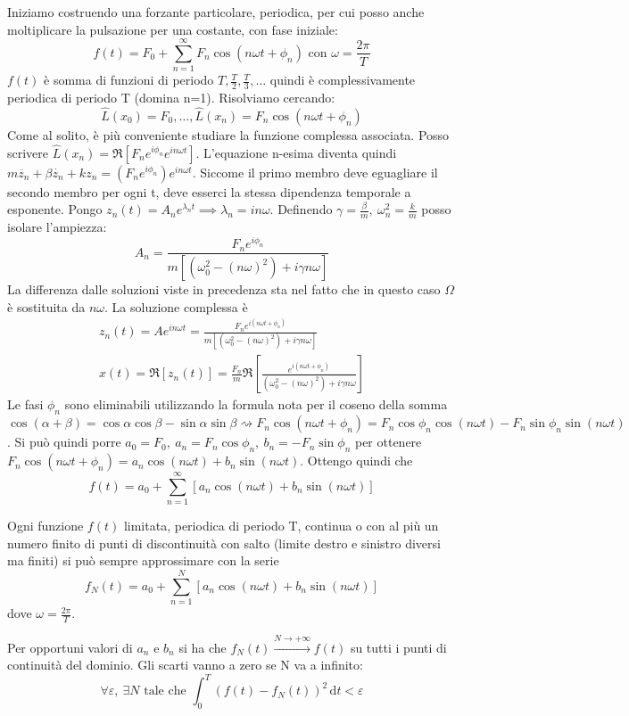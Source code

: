 Iniziamo costruendo una forzante particolare, periodica, per cui posso anche moltiplicare la pulsazione per una costante, con fase iniziale:
\[
	f(t) = F_0 + \sum_{n=1}^{\infty} F_n \cos (n \omega t + \phi _n) \text{ con } \omega = \frac{2\pi }{T} 
\]
\(f(t)\) è somma di funzioni di periodo \(T, \frac{T}{2}, \frac{T}{3}, \dots \) quindi è complessivamente periodica di periodo T (domina n=1). Risolviamo cercando:
\[
	\hat{L} (x_0)=F_0, \dots , \hat{L} (x_n)= F_n \cos (n \omega t + \phi _n)
\]
Come al solito, è più conveniente studiare la funzione complessa associata. Posso scrivere \(\hat{L} (x_n)=\Re [F_n e^{i \phi _n}e^{in \omega t} ]\). L'equazione n-esima diventa quindi \(m \ddot{z_n} + \beta \dot{z_n} + k z_n = (F_n e^{i \phi _n})e^{in \omega t}\). Siccome il primo membro deve eguagliare il secondo membro per ogni t, deve esserci la stessa dipendenza temporale a esponente. Pongo \(z_n(t)=A_n e^{\lambda _n t} \implies \lambda _n = in \omega \). Definendo \(\gamma =\frac{\beta }{m},\ \omega _n ^{2} = \frac{k}{m}\) posso isolare l'ampiezza:
\[
	A_n = \frac{F_n e^{i \phi _n}}{m [(\omega _0 ^{2} -(n \omega )^{2} ) + i \gamma n \omega ]}
\]
La differenza dalle soluzioni viste in precedenza sta nel fatto che in questo caso \(\Omega \) è sostituita da \(n \omega \). La soluzione complessa è
\begin{gather*}
	z_n(t) = A e^{in \omega t}= \frac{F_n e^{i(n \omega t + \phi _n)}}{m [(\omega _0 ^{2} -(n \omega )^{2} )+i \gamma n \omega ]}\\
	x(t)= \Re [z_n(t)]= \frac{F_n}{m}\Re \left[\frac{e^{i(n \omega t + \phi _n)}}{(\omega _0 ^{2} - (n \omega )^{2} )+i \gamma n \omega }\right] 
\end{gather*}
Le fasi \(\phi _n \) sono eliminabili utilizzando la formula nota per il coseno della somma\(\cos (\alpha +\beta )=\cos \alpha \cos \beta -\sin \alpha \sin \beta \rightsquigarrow F_n \cos (n \omega t + \phi _n) = F_n \cos \phi _n \cos (n \omega t) - F_n \sin \phi _n \sin (n \omega t) \). Si può quindi porre \(a_0 =F_0,\ a_n = F_n \cos \phi _n,\ b_n =-F_n \sin \phi _n\) per ottenere \(F_n \cos (n \omega t + \phi _n) = a_n \cos (n \omega t) + b_n \sin (n \omega t)\).
Ottengo quindi che
\[
	f(t) = a_0 + \sum_{n=1}^{\infty} [a_n \cos (n \omega t) + b_n \sin (n \omega t)]
\]

\begin{theorem}
	Ogni funzione \(f(t)\) limitata, periodica di periodo T, continua o con al più un numero finito di punti di discontinuità con salto (limite destro e sinistro diversi ma finiti) si può sempre approssimare con la serie
	\[
		f_N(t)=a_0 + \sum_{n=1}^{N } [a_n \cos (n \omega t) + b_n \sin (n \omega t)] 
	\]
	dove \(\omega = \frac{2\pi }{T}\).
\end{theorem}

Per opportuni valori di \(a_n\) e \(b_n\) si ha che \(f_N(t)\xrightarrow{N \to +\infty }f(t)\) su tutti i punti di continuità del dominio. Gli scarti vanno a zero se N va a infinito:
\[
	\forall \varepsilon,\ \exists N \text{ tale che } \int_{0}^{T} (f(t) - f_N(t))^{2}  \,\mathrm{d}t < \varepsilon 
\]